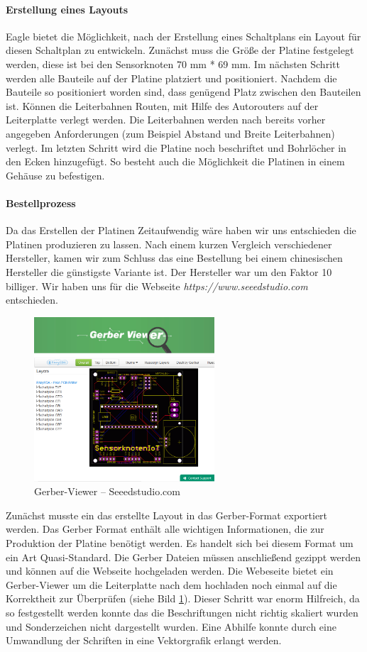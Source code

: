 \paragraph{Erstellung eines Layouts} Eagle bietet die Möglichkeit, nach der Erstellung eines Schaltplans ein Layout für diesen Schaltplan zu entwickeln. Zunächst muss die Größe der Platine festgelegt werden, diese ist bei den Sensorknoten 70 mm * 69 mm. Im nächsten Schritt werden alle Bauteile auf der Platine platziert und positioniert. Nachdem die Bauteile so positioniert worden sind, dass genügend Platz zwischen den Bauteilen ist. Können die Leiterbahnen Routen, mit Hilfe des Autorouters auf der Leiterplatte verlegt werden. Die Leiterbahnen werden nach bereits vorher angegeben Anforderungen (zum Beispiel Abstand und Breite Leiterbahnen) verlegt. Im letzten Schritt wird die Platine noch beschriftet und Bohrlöcher in den Ecken hinzugefügt. So besteht auch die Möglichkeit die Platinen in einem Gehäuse zu befestigen. 
\paragraph{Bestellprozess} Da das Erstellen der Platinen Zeitaufwendig wäre haben wir uns entschieden die Platinen produzieren zu lassen. Nach einem kurzen Vergleich verschiedener Hersteller, kamen wir zum Schluss das eine Bestellung bei einem chinesischen Hersteller die günstigste Variante ist. Der Hersteller war um den Faktor 10 billiger. Wir haben uns für die Webseite \textit{https://www.seeedstudio.com} entschieden. 
\begin{figure}
	\centering
	\includegraphics[width=0.6\textwidth]{bilder/gerberViewer}
	\caption{Gerber-Viewer – Seeedstudio.com}
	\label{img:GerberViewer}
\end{figure}

Zunächst musste ein das erstellte Layout in das Gerber-Format exportiert werden. Das Gerber Format enthält alle wichtigen Informationen, die zur Produktion der Platine benötigt werden. Es handelt sich bei diesem Format um ein Art Quasi-Standard. Die Gerber Dateien müssen anschließend gezippt werden und können auf die Webseite hochgeladen werden. Die Webeseite bietet ein Gerber-Viewer um die Leiterplatte nach dem hochladen noch einmal auf die Korrektheit zur Überprüfen (siehe Bild \ref{img:GerberViewer}). Dieser Schritt war enorm Hilfreich, da so festgestellt werden konnte das die Beschriftungen nicht richtig skaliert wurden und Sonderzeichen nicht dargestellt wurden. Eine Abhilfe konnte durch eine Umwandlung der Schriften in eine Vektorgrafik erlangt werden. 

